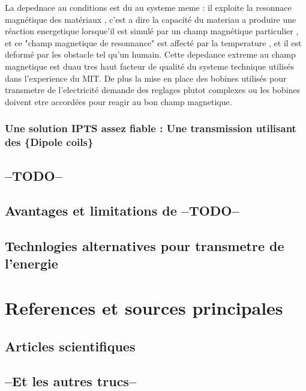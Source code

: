 \documentclass[11pt]{report}
\begin{document}
	La depednace au conditions est du au systeme meme : il exploite la resonnace magnétique des matériaux , c'est a dire la capacité du materiau a produire une réaction energetique lorsque'il est simulé par un champ magnétique particulier , et ce "champ magnetique de resonnance" est affecté par la temperature , et il est deformé par les obstacle tel qu'un humain. Cette depedance extreme au champ magnetique est duau tres haut facteur de qualité du systeme technique utilisés dans l'experience du MIT. De plus la mise en place des bobines utilisés pour transmetre de l'electricité demande des reglages plutot complexes ou les bobines doivent etre accordées pour reagir au bon champ magnetique.
\subsection{Une solution IPTS assez fiable : Une transmission utilisant des \{Dipole coils\}}
\section{--TODO--} %
\section{Avantages et limitations de --TODO--}
\section{Technlogies alternatives pour transmetre de l'energie}

\chapter{References et sources principales}
\section{Articles scientifiques}
\section{--Et les autres trucs--}
\end{document}
